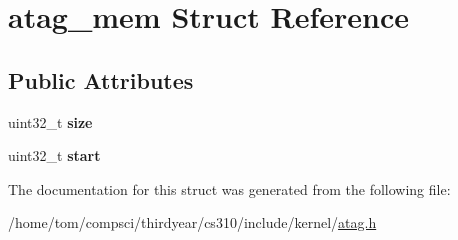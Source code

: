 \hypertarget{structatag__mem}{}\section{atag\+\_\+mem Struct Reference}
\label{structatag__mem}
\subsection*{Public Attributes}
\begin{DoxyCompactItemize}
\item 
\mbox{\label{structatag__mem_a217d0d492ee50f1f5a6f8926a21dd049}} 
uint32\+\_\+t {\bfseries size}
\item 
\mbox{\label{structatag__mem_ab3fb0b65e932c4665607024a8cfd8b79}} 
uint32\+\_\+t {\bfseries start}
\end{DoxyCompactItemize}


The documentation for this struct was generated from the following file\+:\begin{DoxyCompactItemize}
\item 
/home/tom/compsci/thirdyear/cs310/include/kernel/\mbox{\hyperlink{atag_8h}{atag.\+h}}\end{DoxyCompactItemize}
